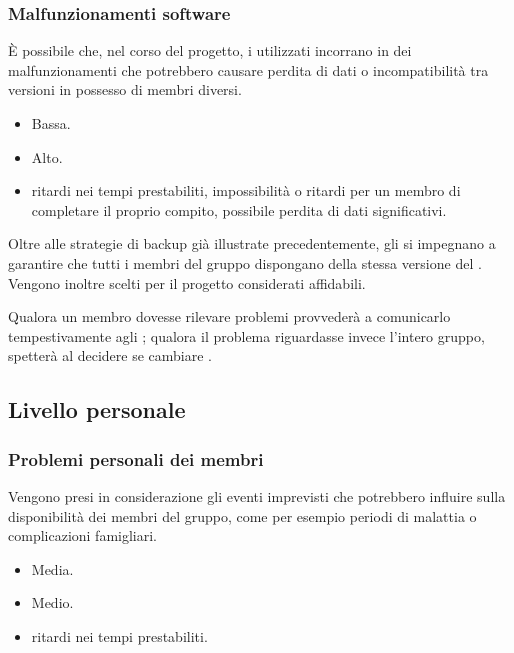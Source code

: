 \documentclass[a4paper, titlepage]{article}
\begin{document}
\subsubsection{Malfunzionamenti software}
 È possibile che, nel corso del progetto, i  utilizzati incorrano in dei malfunzionamenti che potrebbero causare perdita di dati o incompatibilità tra versioni in possesso di membri diversi.
 
	\begin{itemize}
		\item {} Bassa.
		\item {} Alto.
		\item {} ritardi nei tempi prestabiliti, impossibilità o ritardi per un membro di completare il proprio compito, possibile perdita di dati significativi.
	\end{itemize}

 Oltre alle strategie di backup già illustrate precedentemente, gli  si impegnano a garantire che tutti i membri del gruppo dispongano della stessa versione del . Vengono inoltre scelti per il progetto  considerati affidabili.
 
 Qualora un membro dovesse rilevare problemi  provvederà a comunicarlo tempestivamente agli ; qualora il problema riguardasse invece l'intero gruppo, spetterà al  decidere se cambiare .


\subsection{Livello personale}
\subsubsection{Problemi personali dei membri}
 Vengono presi in considerazione gli eventi imprevisti che potrebbero influire sulla disponibilità dei membri del gruppo, come per esempio periodi di malattia o complicazioni famigliari.
 
	\begin{itemize}
		\item {} Media.
		\item {} Medio.
		\item {} ritardi nei tempi prestabiliti.
	\end{itemize}
	
\end{document}
